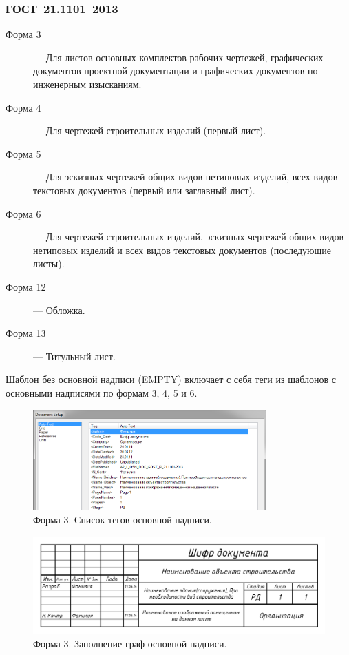 \documentclass[14pt]{extreport}
\begin{document}
\subsubsection{ГОСТ~21.1101--2013}
\noindent
\begin{description}
	\item [Форма 3] --- Для листов основных комплектов рабочих чертежей, графических документов проектной документации и графических документов по инженерным изысканиям.
	\item [Форма 4] --- Для чертежей строительных изделий (первый лист).
	\item [Форма 5] --- Для эскизных чертежей общих видов нетиповых изделий, всех видов текстовых документов (первый или заглавный лист).
	\item [Форма 6] --- Для чертежей строительных изделий, эскизных чертежей общих видов нетиповых изделий и всех видов текстовых документов (последующие листы).
	\item [Форма 12] --- Обложка.
	\item [Форма 13] --- Титульный лист.

\end{description}

Шаблон без основной надписи (\textsf{EMPTY}) включает с себя теги из шаблонов с основными надписями по формам 3, 4, 5 и 6.

\begin{figure}[h]
	\centering
	\includegraphics[width=0.8\textwidth]{SPDS_OSN_DOC}
    \caption{Форма 3. Список тегов основной надписи.\label{SPDS_OSN_DOC}}
\end{figure}

\begin{figure}[h]
	\centering
	\includegraphics[width=\textwidth]{SPDS_OSN_DOC_without_tagname}
    \caption{Форма 3. Заполнение граф основной надписи.\label{SPDS_OSN_DOC_without_tagname}}
\end{figure}
\end{document}
